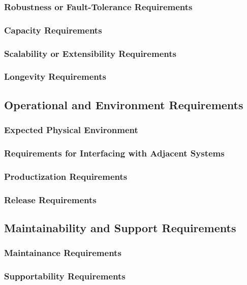 \documentclass[12pt, titlepage]{article}
\begin{document}
    \subsubsection{Robustness or Fault-Tolerance Requirements}
    \subsubsection{Capacity Requirements}
    \subsubsection{Scalability or Extensibility Requirements}
    \subsubsection{Longevity Requirements}
  
  \subsection{Operational and Environment Requirements}

	\subsubsection{Expected Physical Environment}
    \subsubsection{Requirements for Interfacing with Adjacent Systems}
    \subsubsection{Productization Requirements}
    \subsubsection{Release Requirements}

  \subsection{Maintainability and Support Requirements}

    \subsubsection{Maintainance Requirements}
    \subsubsection{Supportability Requirements}
\end{document}
